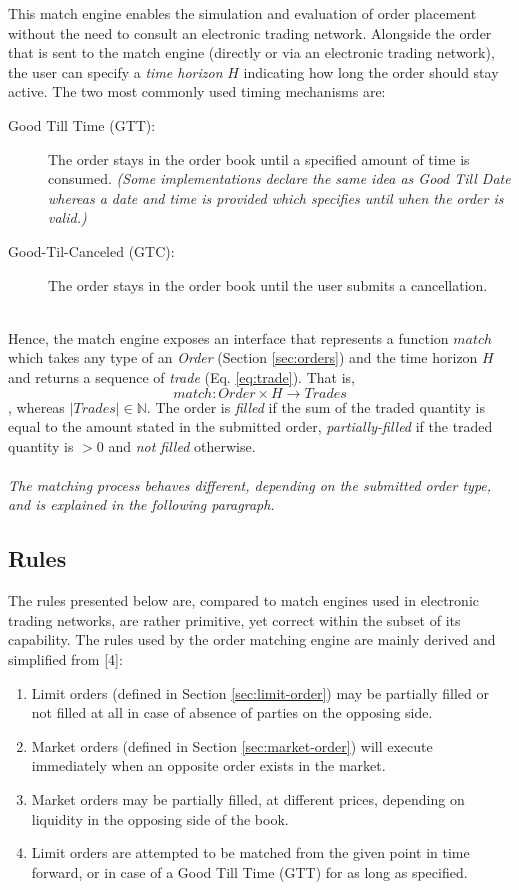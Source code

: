 This match engine enables the simulation and evaluation of order placement without the need to consult an electronic trading network.
Alongside the order that is sent to the match engine (directly or via an electronic trading network), the user can specify a \textit{time horizon} $H$ indicating how long the order should stay active.
The two most commonly used timing mechanisms are:
\begin{description}
    \item[Good Till Time (GTT): ] The order stays in the order book until a specified amount of time is consumed. \textit{(Some implementations declare the same idea as Good Till Date whereas a date and time is provided which specifies until when the order is valid.)}
    \item[Good-Til-Canceled (GTC): ] The order stays in the order book until the user submits a cancellation.
\end{description}
\hfill
\\
Hence, the match engine exposes an interface that represents a function $match$ which takes any type of an \textit{Order} (Section \ref{sec:orders}) and the time horizon $H$ and returns a sequence of \textit{trade} (Eq. \ref{eq:trade}).
That is,
\begin{equation}
    match : Order \times H \rightarrow Trades
\end{equation}
, whereas $|Trades| \in \mathbb{N}$.
The order is \textit{filled} if the sum of the traded quantity is equal to the amount stated in the submitted order, \textit{partially-filled} if the traded quantity is $> 0$ and \textit{not filled} otherwise.
\\
\\
\textit{The matching process behaves different, depending on the submitted order type, and is explained in the following paragraph.}

\subsection{Rules}

The rules presented below are, compared to match engines used in electronic trading networks, are rather primitive, yet correct within the subset of its capability.
The rules used by the order matching engine are mainly derived and simplified from [4]:
\begin{enumerate}
    \item Limit orders (defined in Section \ref{sec:limit-order}) may be partially filled or not filled at all in case of absence of parties on the opposing side.
    
    \item Market orders (defined in Section \ref{sec:market-order}) will execute immediately when an opposite order exists in the market.
    \item Market orders may be partially filled, at different prices, depending on liquidity in the opposing side of the book.
    \item Limit orders are attempted to be matched from the given point in time forward, or in case of a Good Till Time (GTT) for as long as specified.
\end{enumerate}



